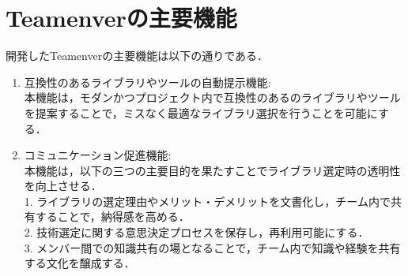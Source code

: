 \documentclass[main]{subfiles}
\begin{document}
\section{Teamenverの主要機能}
開発したTeamenverの主要機能は以下の通りである．
\begin{enumerate}
\item 互換性のあるライブラリやツールの自動提示機能: \\
本機能は，モダンかつプロジェクト内で互換性のあるのライブラリやツールを提案することで，ミスなく最適なライブラリ選択を行うことを可能にする．
\item コミュニケーション促進機能: \\
本機能は，以下の三つの主要目的を果たすことでライブラリ選定時の透明性を向上させる．\\
1.	ライブラリの選定理由やメリット・デメリットを文書化し，チーム内で共有することで，納得感を高める．\\
2.	技術選定に関する意思決定プロセスを保存し，再利用可能にする．\\
3.	メンバー間での知識共有の場となることで，チーム内で知識や経験を共有する文化を醸成する．\\
\end{enumerate}
\end{document}

